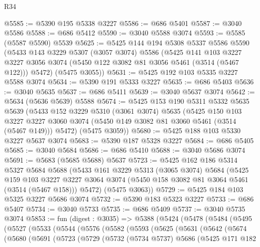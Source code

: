 \begin{lexlean}{R34}
\begin{coremodule}
@5585 := @5390 @195 @5338 @3227
@5586 := @686 @5401
@5587 := @3040 @5586
@5588 := @686 @5412
@5590 := @3040 @5588 @3074
@5593 := @5585 (@5587 @5590) @5539
@5625 := @5425
    @144
    @194
    @5308
    @5337
    @5586
    @5590
    (@5433
      @143
      @3229
      @5307
      (@3057 @3074)
      @5586
      (@5425
        @141
        @103
        @3227
        @3227
        @3056
        @3074
        (@5450 @122 @3082 @81 @3056 @5461 (@3514 (@5467 @122)))
        @5472)
      (@5475 @3055))
@5631 := @5425 @192 @103 @5335 @3227 @5588 @3074
@5634 := @5390 @191 @5333 @3227
@5635 := @686 @5403
@5636 := @3040 @5635
@5637 := @686 @5411
@5639 := @3040 @5637 @3074
@5642 := @5634 (@5636 @5639) @5588
@5674 := @5425
    @153
    @190
    @5311
    @5332
    @5635
    @5639
    (@5433
      @152
      @3229
      @5310
      (@3061 @3074)
      @5635
      (@5425
        @150
        @103
        @3227
        @3227
        @3060
        @3074
        (@5450 @149 @3082 @81 @3060 @5461 (@3514 (@5467 @149)))
        @5472)
      (@5475 @3059))
@5680 := @5425 @188 @103 @5330 @3227 @5637 @3074
@5683 := @5390 @187 @5328 @3227
@5684 := @686 @5405
@5685 := @3040 @5684
@5686 := @686 @5410
@5688 := @3040 @5686 @3074
@5691 := @5683 (@5685 @5688) @5637
@5723 := @5425
    @162
    @186
    @5314
    @5327
    @5684
    @5688
    (@5433
      @161
      @3229
      @5313
      (@3065 @3074)
      @5684
      (@5425
        @159
        @103
        @3227
        @3227
        @3064
        @3074
        (@5450 @158 @3082 @81 @3064 @5461 (@3514 (@5467 @158)))
        @5472)
      (@5475 @3063))
@5729 := @5425 @184 @103 @5325 @3227 @5686 @3074
@5732 := @5390 @183 @5323 @3227
@5733 := @686 @5407
@5734 := @3040 @5733
@5735 := @686 @5409
@5737 := @3040 @5735 @3074
@5853 := fun (digest : @3035) =>
  @5388
    (@5424
      (@5478
        (@5484
          (@5495
            (@5527
              (@5533
                (@5544
                  (@5576
                    (@5582
                      (@5593
                        (@5625
                          (@5631
                            (@5642
                              (@5674
                                (@5680
                                  (@5691
                                    (@5723
                                      (@5729
                                        (@5732
                                          (@5734 @5737)
                                          @5686
                                          (@5425
                                            @171
                                            @182

\end{coremodule}
\end{lexlean}
